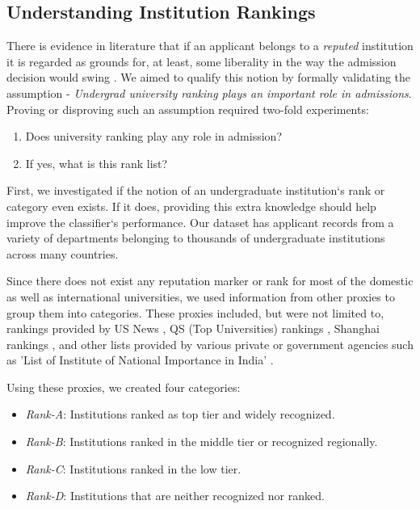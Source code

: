 \documentclass{sig-alternate-05-2015}
\begin{document}
\subsection{Understanding Institution Rankings}
\label{subsec:ranking-exp}
There is evidence in literature that if an applicant belongs to a \textit{reputed} institution it is regarded as grounds for, at least, some liberality in the way the admission decision would swing \cite{dagap}. We aimed to qualify this notion by formally validating the assumption - \textit{Undergrad university ranking plays an important role in admissions}. Proving or disproving such an assumption required two-fold experiments:\\
\begin{enumerate}
\item Does university ranking play any role in admission?
\item If yes, what is this rank list?
\end{enumerate}

First, we investigated if the notion of an undergraduate institution`s rank or category even exists. If it does, providing this extra knowledge should help improve the classifier`s performance. Our dataset has applicant records from a variety of departments belonging to thousands of undergraduate institutions across many countries.

Since there does not exist any reputation marker or rank for most of the domestic as well as international universities, we used information from other proxies to group them into categories. These proxies included, but were not limited to, rankings provided by US News \cite{usnews}, QS (Top Universities) rankings \cite{qs}, Shanghai rankings \cite{shanghai}, and other lists provided by various private or government agencies such as 'List of Institute of National Importance in India' \cite{national-importance}.

Using these proxies, we created four categories:
\begin{itemize}
\item \textit{Rank-A}: Institutions ranked as top tier and widely recognized.
\item \textit{Rank-B}: Institutions ranked in the middle tier or recognized regionally.
\item \textit{Rank-C}: Institutions ranked in the low tier.
\item \textit{Rank-D}: Institutions that are neither recognized nor ranked.
\end{itemize}
\end{document}
